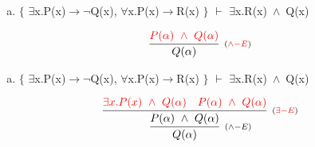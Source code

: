 \documentclass[aspectratio=43]{beamer}
\newcommand{\ria}{$\rightarrow$}
\newcommand{\fall}{$\forall$}
\newcommand{\ex}{$\exists$}
\newcommand{\nao}{$\neg$}
\newcommand{\andd}{$\wedge$}
\begin{document}
    \begin{frame}[fragile]
    
    	\begin{enumerate}[d)]
			\item $\{$ \ex x.P(x)\ria \nao Q(x), \fall x.P(x)\ria R(x) $\}$ $\vdash$ \ex x.R(x)\ \andd\ Q(x) \\
		\end{enumerate}
        
        \vspace{70pt}
        
        \[
        \begin{array}{c}
		
        	\infer[_{(\textcolor{red}{\land -E})}] 
                	{Q(\alpha)}
                    {\textcolor{red}{P(\alpha)\ \land \ Q(\alpha)}}
		\end{array}
        \]
        
	\end{frame}
    
    \begin{frame}[fragile]
    
    	\begin{enumerate}[d)]
			\item $\{$ \ex x.P(x)\ria \nao Q(x), \fall x.P(x)\ria R(x) $\}$ $\vdash$ \ex x.R(x)\ \andd\ Q(x) \\
		\end{enumerate}
        
        \vspace{80pt}
        
        \[
        \begin{array}{c}
		
        	\infer[_{(\land -E)}] 
                	{Q(\alpha)}
                    {\infer[_{(\textcolor{red}{\exists -E})}]
                    	{P(\alpha)\ \land \ Q(\alpha)}
                    	{\textcolor{red}{\exists x.P(x)\ \land \ Q(\alpha)}
                        \hspace{10pt}
                        \textcolor{red}{P(\alpha)\ \land \ Q(\alpha)}
                        }
                    }
		\end{array}
        \]
        
	\end{frame}
    
\end{document}
